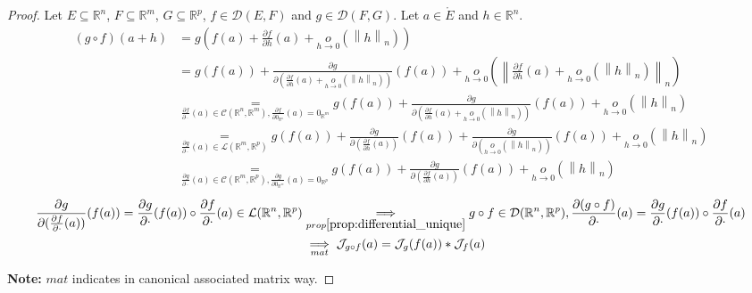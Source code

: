 \documentclass[11pt,en]{elegantpaper}
\newcommand\norm[1]{\left\lVert#1\right\rVert}
\begin{document}
\begin{proof}
  Let $E \subseteq \mathbb{R}^n$, $F \subseteq \mathbb{R}^m$, $G \subseteq \mathbb{R}^p$, $f \in \mathcal{D}(E,F)$ and $g \in \mathcal{D}(F,G)$.
  Let $a \in \mathring{E}$ and $h \in \mathbb{R}^n$.
  \begin{equation*}
    \begin{split}
      (g \circ f)(a+h) & = g(f(a) + \frac{\partial f}{\partial h}(a) + \underset{h \to 0}o(\norm h _n)) \\
      & = g(f(a)) + \frac{\partial g}{\partial (\frac{\partial f}{\partial h}(a) + \underset{h \to 0}o(\norm h _n))}(f(a))
        + \underset{h \to 0}o(\norm{\frac{\partial f}{\partial h}(a) + \underset{h \to 0}o(\norm h _n)}_n) \\
      & \underset{\frac{\partial f}{\partial \cdot}(a) \in \mathcal{C}(\mathbb{R}^n,\mathbb{R}^m),\frac{\partial f}{\partial 0_{\mathbb{R}^n}}(a) = 0_{\mathbb{R}^m}}
        = g(f(a)) + \frac{\partial g}{\partial (\frac{\partial f}{\partial h}(a) + \underset{h \to 0}o(\norm h _n))}(f(a)) + \underset{h \to 0}o(\norm h _n) \\
      & \underset{\frac{\partial g}{\partial \cdot}(a) \in \mathcal{L}(\mathbb{R}^m,\mathbb{R}^p)}
        = g(f(a)) + \frac{\partial g}{\partial (\frac{\partial f}{\partial h}(a))}(f(a)) + \frac{\partial g}{\partial (\underset{h \to 0}o(\norm h _n))}(f(a)) + \underset{h \to 0}o(\norm h _n) \\
      & \underset{\frac{\partial g}{\partial \cdot}(a) \in \mathcal{C}(\mathbb{R}^m,\mathbb{R}^p),\frac{\partial g}{\partial 0_{\mathbb{R}^m}}(a) = 0_{\mathbb{R}^p}}
        = g(f(a)) + \frac{\partial g}{\partial (\frac{\partial f}{\partial h}(a))}(f(a)) + \underset{h \to 0}o(\norm h _n)
    \end{split}
  \end{equation*}
  \begin{equation*}
    \begin{split}
      \frac{\partial g}{\partial (\frac{\partial f}{\partial \cdot}(a))}(f(a)) = \frac{\partial g}{\partial \cdot}(f(a)) \circ \frac{\partial f}{\partial \cdot}(a) \in \mathcal{L}(\mathbb{R}^n, \mathbb{R}^p)
      & \underset{prop\ref{prop:differential_unique}}\implies g \circ f \in \mathcal{D}(\mathbb{R}^n, \mathbb{R}^p), \frac{\partial (g \circ f)}{\partial \cdot}(a) = \frac{\partial g}{\partial \cdot}(f(a)) \circ \frac{\partial f}{\partial \cdot}(a) \\
      & \underset{mat}\implies \mathcal{J}_{g \circ f}(a) = \mathcal{J}_{g}(f(a)) * \mathcal{J}_{f}(a)
    \end{split}
  \end{equation*} \par

  \textbf{Note:} $mat$ indicates in canonical associated matrix way. \par
\end{proof}
\end{document}
